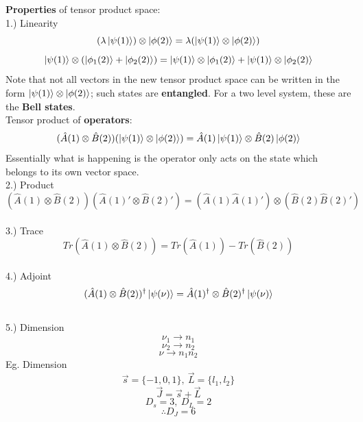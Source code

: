 \documentclass{article}
\begin{document}
\begin{flushleft}
\textbf{Properties} of tensor product space:\\[0.5cm]
1.) Linearity
$$(\lambda\ket{\psi(1)})\otimes\ket{\phi(2)}=\lambda(\ket{\psi(1)}\otimes\ket{\phi(2)})$$
$$\ket{\psi(1)}\otimes(\ket{\phi_1(2)}+\ket{\phi_2(2)})=\ket{\psi(1)}\otimes\ket{\phi_1(2)}+\ket{\psi(1)}\otimes\ket{\phi_2(2)}$$
Note that not all vectors in the new tensor product space can be written in the form $\ket{\psi(1)}\otimes\ket{\phi(2)}$; such states are \textbf{entangled}. For a two level system, these are the \textbf{Bell states}.\\[0.2cm]

Tensor product of \textbf{operators}:
$$(\hat{A}(1)\otimes\hat{B}(2))(\ket{\psi(1)}\otimes\ket{\phi(2)})=\hat{A}(1)\ket{\psi(1)}\otimes\hat{B}(2)\ket{\phi(2)}$$
Essentially what is happening is the operator only acts on the state which belongs to its own vector space.\\[0.5cm]
2.) Product
$$(\hat{A}(1)\otimes\hat{B}(2))(\hat{A}(1)'\otimes\hat{B}(2)')=(\hat{A}(1)\hat{A}(1)')\otimes(\hat{B}(2)\hat{B}(2)')$$\\[0.5cm]

3.) Trace
$$Tr(\hat{A}(1)\otimes\hat{B}(2))=Tr(\hat{A}(1))-Tr(\hat{B}(2))$$\\[0.5cm]

4.) Adjoint
$$(\hat{A}(1)\otimes\hat{B}(2))^\dagger\ket{\psi(\nu)}=\hat{A}(1)^\dagger\otimes\hat{B}(2)^\dagger\ket{\psi(\nu)}$$\\[0.5cm]

5.) Dimension
$$\nu_1\rightarrow n_1$$
$$\nu_2\rightarrow n_2$$
$$\nu\rightarrow n_1n_2$$
Eg. Dimension
$$\vec{s}=\{-1,0,1\},\ \vec{L}=\{l_1,l_2\}$$
$$\vec{J}=\vec{s}+\vec{L}$$
$$D_s=3,\ D_L=2$$
$$\therefore D_J=6$$


\end{flushleft}
\end{document}
